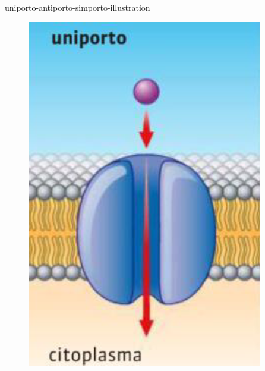 \documentclass[preview]{standalone}
\begin{document}
\begin{snippet}{uniporto-antiporto-simporto-illustration}
    \begin{figure}[h!]
        \begin{minipage}{0.3\textwidth}
          \centering
          \includegraphics[width=\linewidth]{resources/uniporto.png}
        \end{minipage}%
        \hfill
        \begin{minipage}{0.3\textwidth}
          \centering

\end{minipage}
\end{figure}
\end{snippet}
\end{document}
